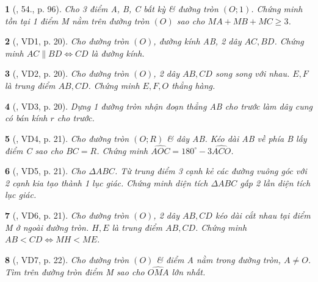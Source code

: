 \documentclass{article}
\newtheorem{baitoan}{}
\begin{document}
\begin{baitoan}[\cite{Binh_Toan_9_tap_1}, 54., p. 96]
	Cho 3 điểm A, B, C bất kỳ \& đường tròn $(O;1)$. Chứng minh tồn tại 1 điểm M nằm trên đường tròn $(O)$ sao cho $MA + MB + MC\ge3$.
\end{baitoan}

\begin{baitoan}[\cite{TLCT_THCS_Toan_9_hinh_hoc}, VD1, p. 20]
	Cho đường tròn $(O)$, đường kính AB, 2 dây $AC,BD$. Chứng minh $AC\parallel BD\Leftrightarrow CD$ là đường kính.
\end{baitoan}

\begin{baitoan}[\cite{TLCT_THCS_Toan_9_hinh_hoc}, VD2, p. 20]
	Cho đường tròn $(O)$, 2 dây $AB,CD$ song song với nhau. $E,F$ là trung điểm $AB,CD$. Chứng minh $E,F,O$ thẳng hàng.
\end{baitoan}

\begin{baitoan}[\cite{TLCT_THCS_Toan_9_hinh_hoc}, VD3, p. 20]
	Dựng 1 đường tròn nhận đoạn thẳng AB cho trước làm dây cung có bán kính $r$ cho trước.
\end{baitoan}

\begin{baitoan}[\cite{TLCT_THCS_Toan_9_hinh_hoc}, VD4, p. 21]
	Cho đường tròn $(O;R)$ \& dây AB. Kéo dài AB về phía B lấy điểm C sao cho $BC = R$. Chứng minh $\widehat{AOC} = 180^\circ - 3\widehat{ACO}$.
\end{baitoan}

\begin{baitoan}[\cite{TLCT_THCS_Toan_9_hinh_hoc}, VD5, p. 21]
	Cho $\Delta ABC$. Từ trung điểm 3 cạnh kẻ các đường vuông góc với 2 cạnh kia tạo thành 1 lục giác. Chứng minh diện tích $\Delta ABC$ gấp 2 lần diện tích lục giác.
\end{baitoan}

\begin{baitoan}[\cite{TLCT_THCS_Toan_9_hinh_hoc}, VD6, p. 21]
	Cho đường tròn $(O)$, 2 dây $AB,CD$ kéo dài cắt nhau tại điểm M ở ngoài đường tròn. $H,E$ là trung điểm $AB,CD$. Chứng minh $AB < CD\Leftrightarrow MH < ME$.
\end{baitoan}

\begin{baitoan}[\cite{TLCT_THCS_Toan_9_hinh_hoc}, VD7, p. 22]
	Cho đường tròn $(O)$ \& điểm A nằm trong đường tròn, $A\ne O$. Tìm trên đường tròn điểm M sao cho $\widehat{OMA}$ lớn nhất.
\end{baitoan}
\end{document}
